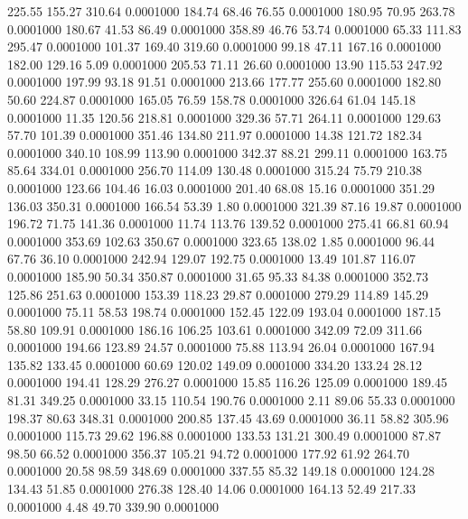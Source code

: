  225.55  155.27  310.64   0.0001000
 184.74   68.46   76.55   0.0001000
 180.95   70.95  263.78   0.0001000
 180.67   41.53   86.49   0.0001000
 358.89   46.76   53.74   0.0001000
  65.33  111.83  295.47   0.0001000
 101.37  169.40  319.60   0.0001000
  99.18   47.11  167.16   0.0001000
 182.00  129.16    5.09   0.0001000
 205.53   71.11   26.60   0.0001000
  13.90  115.53  247.92   0.0001000
 197.99   93.18   91.51   0.0001000
 213.66  177.77  255.60   0.0001000
 182.80   50.60  224.87   0.0001000
 165.05   76.59  158.78   0.0001000
 326.64   61.04  145.18   0.0001000
  11.35  120.56  218.81   0.0001000
 329.36   57.71  264.11   0.0001000
 129.63   57.70  101.39   0.0001000
 351.46  134.80  211.97   0.0001000
  14.38  121.72  182.34   0.0001000
 340.10  108.99  113.90   0.0001000
 342.37   88.21  299.11   0.0001000
 163.75   85.64  334.01   0.0001000
 256.70  114.09  130.48   0.0001000
 315.24   75.79  210.38   0.0001000
 123.66  104.46   16.03   0.0001000
 201.40   68.08   15.16   0.0001000
 351.29  136.03  350.31   0.0001000
 166.54   53.39    1.80   0.0001000
 321.39   87.16   19.87   0.0001000
 196.72   71.75  141.36   0.0001000
  11.74  113.76  139.52   0.0001000
 275.41   66.81   60.94   0.0001000
 353.69  102.63  350.67   0.0001000
 323.65  138.02    1.85   0.0001000
  96.44   67.76   36.10   0.0001000
 242.94  129.07  192.75   0.0001000
  13.49  101.87  116.07   0.0001000
 185.90   50.34  350.87   0.0001000
  31.65   95.33   84.38   0.0001000
 352.73  125.86  251.63   0.0001000
 153.39  118.23   29.87   0.0001000
 279.29  114.89  145.29   0.0001000
  75.11   58.53  198.74   0.0001000
 152.45  122.09  193.04   0.0001000
 187.15   58.80  109.91   0.0001000
 186.16  106.25  103.61   0.0001000
 342.09   72.09  311.66   0.0001000
 194.66  123.89   24.57   0.0001000
  75.88  113.94   26.04   0.0001000
 167.94  135.82  133.45   0.0001000
  60.69  120.02  149.09   0.0001000
 334.20  133.24   28.12   0.0001000
 194.41  128.29  276.27   0.0001000
  15.85  116.26  125.09   0.0001000
 189.45   81.31  349.25   0.0001000
  33.15  110.54  190.76   0.0001000
   2.11   89.06   55.33   0.0001000
 198.37   80.63  348.31   0.0001000
 200.85  137.45   43.69   0.0001000
  36.11   58.82  305.96   0.0001000
 115.73   29.62  196.88   0.0001000
 133.53  131.21  300.49   0.0001000
  87.87   98.50   66.52   0.0001000
 356.37  105.21   94.72   0.0001000
 177.92   61.92  264.70   0.0001000
  20.58   98.59  348.69   0.0001000
 337.55   85.32  149.18   0.0001000
 124.28  134.43   51.85   0.0001000
 276.38  128.40   14.06   0.0001000
 164.13   52.49  217.33   0.0001000
   4.48   49.70  339.90   0.0001000
